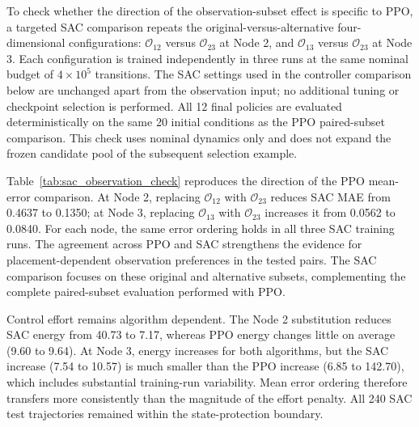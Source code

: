 To check whether the direction of the observation-subset effect is specific to PPO, a targeted SAC comparison repeats the original-versus-alternative four-dimensional configurations: $\mathcal O_{12}$ versus $\mathcal O_{23}$ at Node 2, and $\mathcal O_{13}$ versus $\mathcal O_{23}$ at Node 3. Each configuration is trained independently in three runs at the same nominal budget of $4\times10^5$ transitions. The SAC settings used in the controller comparison below are unchanged apart from the observation input; no additional tuning or checkpoint selection is performed. All 12 final policies are evaluated deterministically on the same 20 initial conditions as the PPO paired-subset comparison. This check uses nominal dynamics only and does not expand the frozen candidate pool of the subsequent selection example.



Table~\ref{tab:sac_observation_check} reproduces the direction of the PPO mean-error comparison. At Node 2, replacing $\mathcal O_{12}$ with $\mathcal O_{23}$ reduces SAC MAE from 0.4637 to 0.1350; at Node 3, replacing $\mathcal O_{13}$ with $\mathcal O_{23}$ increases it from 0.0562 to 0.0840. For each node, the same error ordering holds in all three SAC training runs. The agreement across PPO and SAC strengthens the evidence for placement-dependent observation preferences in the tested pairs. The SAC comparison focuses on these original and alternative subsets, complementing the complete paired-subset evaluation performed with PPO.

Control effort remains algorithm dependent. The Node 2 substitution reduces SAC energy from 40.73 to 7.17, whereas PPO energy changes little on average (9.60 to 9.64). At Node 3, energy increases for both algorithms, but the SAC increase (7.54 to 10.57) is much smaller than the PPO increase (6.85 to 142.70), which includes substantial training-run variability. Mean error ordering therefore transfers more consistently than the magnitude of the effort penalty. All 240 SAC test trajectories remained within the state-protection boundary.
